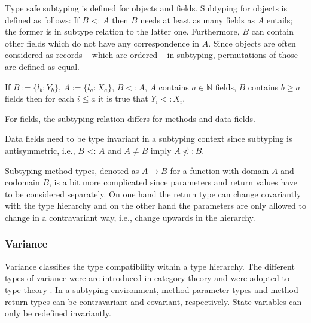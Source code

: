 Type safe subtyping is defined for objects and fields. Subtyping for
objects is defined as follows: If $B$ <: $A$ then $B$ needs at least as
many fields as $A$ entails; the former is in subtype relation to the
latter one. Furthermore, $B$ can contain other fields which
do not have any correspondence in $A$. Since objects are often considered
as records -- which are ordered -- in subtyping, permutations of those
are defined as equal.
\begin{defn}
	\label{def:subtypeObject}
	If $B := \{l_b : Y_b\}$, $A := \{l_a : X_a\}$, $B <: A$, $A$
	contains $a \in \mathbb{N}$ fields, $B$ contains $b \geq a$
	fields then for each $i\leq a$ it is true that $Y_i <: X_i$.
\end{defn}

For fields, the subtyping relation differs for methods and data fields.

Data fields need to be type invariant in a subtyping context since
subtyping is antisymmetric, i.e., $B$ <: $A$ and $A \neq B$ imply $A \nless: B$.

Subtyping method types, denoted as $A \rightarrow B$ for a function with
domain $A$ and codomain $B$, is a bit more complicated since parameters
and return values have to be considered separately. On one hand the return
type can change covariantly with the type hierarchy and on the other hand
the parameters are only allowed to change in a contravariant way, i.e.,
change upwards in the hierarchy.

\begin{defn}
\label{def:methodSubtyping}
	\begin{mathpar}
	\end{mathpar}
\end{defn}

\subsubsection{Variance}
Variance classifies the type compatibility within a type hierarchy. The
different types of variance were are introduced in category theory and
were adopted to type theory \cite{pierce_basic_1991}. In a subtyping
environment, method parameter types and method return types can be
contravariant and covariant, respectively. State variables can only be
redefined invariantly.

